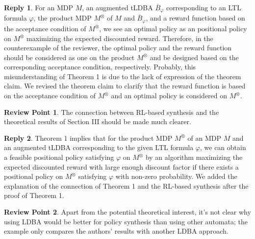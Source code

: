 \documentclass[10 pt, dvipdfmx]{article}
\theoremstyle{definition}
\newtheorem{review point}{Review Point}[section]
\newtheorem*{reply}{Reply}
\begin{document}
\begin{reply}
  For an MDP $M$, an augmented tLDBA $\bar{B}_{\varphi}$ corresponding to an LTL formula $\varphi$, the product MDP $M^{\otimes}$ of $M$ and $\bar{B}_{\varphi}$, and a reward function based on the acceptance condition of $M^{\otimes}$, we see an optimal policy as an positional policy on $M^{\otimes}$ maximizing the expected discounted reward. Therefore, in the counterexample of the reviewer, the optimal policy and the reward function should be considered as one on the product $M^{\otimes}$ and be designed based on the corresponding acceptance condition, respectively. Probably, this misunderstanding of Theorem 1 is due to the lack of expression of the theorem claim. We revised the theorem claim to clarify that the reward function is based on the acceptance condition of $M^{\otimes}$ and an optimal policy is considered on $M^{\otimes}$.
\end{reply}

\begin{review point}
  The connection between RL-based synthesis and the theoretical results
of Section III should be made much clearer.
\end{review point}

\begin{reply}
  Theorem 1 implies that for the product MDP $M^{\otimes}$ of an MDP $M$ and an augmented tLDBA corresponding to the given LTL formula $\varphi$, we can obtain a feasible positional policy satisfying $\varphi$ on $M^{\otimes}$ by an algorithm maximizing the expected discounted reward with large enough discount factor if there exists a positional policy on $M^{\otimes}$ satisfying $\varphi$ with non-zero probability. We added the explanation of the connection of Theorem 1 and the RL-based synthesis after the proof of Theorem 1.
\end{reply}

\begin{review point}
  Apart from the potential theoretical interest, it's not clear why
using LDBA would be better for policy synthesis than using other
automata; the example only compares the authors' results with another
LDBA approach.
\end{review point}
\end{document}
